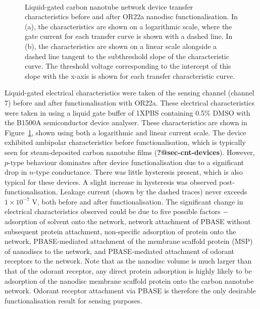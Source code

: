 \documentclass[
  a4paper,
]{scrbook}
\begin{document}
\begin{figure}
\begin{minipage}[t]{0.45\linewidth}
{{}

}

\end{minipage}%
%
\begin{minipage}[t]{0.01\linewidth}

{\centering 

~

}

\end{minipage}%

\caption{\label{fig-OR22a-TX-comparison}Liquid-gated carbon nanotube
network device transfer characteristics before and after OR22a nanodisc
functionalisation. In (a), the characteristics are shown on a
logarithmic scale, where the gate current for each transfer curve is
shown with a dashed line. In (b), the characteristics are shown on a
linear scale alongside a dashed line tangent to the subthreshold slope
of the characteristic curve. The threshold voltage corresponding to the
intercept of this slope with the x-axis is shown for each transfer
characteristic curve.}

\end{figure}

Liquid-gated electrical characteristics were taken of the sensing
channel (channel 7) before and after functionalisation with OR22a. These
electrical characteristics were taken in using a liquid gate buffer of
1XPBS containing 0.5\% DMSO with the B1500A semiconductor device
analyser. These characteristics are shown in
Figure~\ref{fig-OR22a-TX-comparison}, shown using both a logarithmic and
linear current scale. The device exhibited ambipolar characteristics
before functionalisation, which is typically seen for steam-deposited
carbon nanotube films (\textbf{?@sec-cnt-devices}). However, \(p\)-type
behaviour dominates after device functionalisation due to a significant
drop in \(n\)-type conductance. There was little hysteresis present,
which is also typical for these devices. A slight increase in hysteresis
was observed post-functionalisation. Leakage current (shown by the
dashed traces) never exceeds \(1 \times 10^{-7}\) V, both before and
after functionalisation. The significant change in electrical
characteristics observed could be due to five possible factors \(-\)
adsorption of solvent onto the network, network attachment of PBASE
without subsequent protein attachment, non-specific adsorption of
protein onto the network, PBASE-mediated attachment of the membrane
scaffold protein (MSP) of nanodiscs to the network, and PBASE-mediated
attachment of odorant receptors to the network. Note that as the
nanodisc volume is much larger than that of the odorant receptor, any
direct protein adsorption is highly likely to be adsorption of the
nanodisc membrane scaffold protein onto the carbon nanotube network.
Odorant receptor attachment via PBASE is therefore the only desirable
functionalisation result for sensing purposes.
\end{document}
